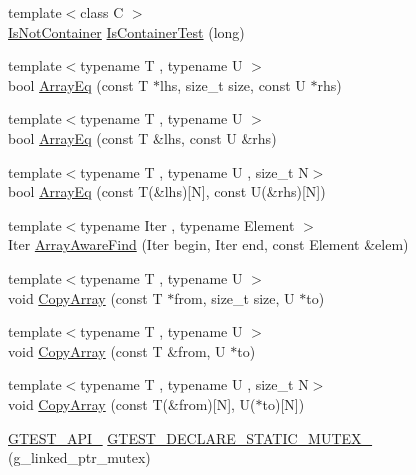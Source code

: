 \begin{DoxyCompactItemize}
\item 
{\footnotesize template$<$class C $>$ }\\\hyperlink{namespacetesting_1_1internal_abf080521ce135deb510e0a7830fd3d33}{Is\+Not\+Container} \hyperlink{namespacetesting_1_1internal_af545a2ae928b8a9e7581978234464275}{Is\+Container\+Test} (long)
\item 
{\footnotesize template$<$typename T , typename U $>$ }\\bool \hyperlink{namespacetesting_1_1internal_af4bebf36baf0b0a5b26d051dde55fa47}{Array\+Eq} (const T $\ast$lhs, size\+\_\+t size, const U $\ast$rhs)
\item 
{\footnotesize template$<$typename T , typename U $>$ }\\bool \hyperlink{namespacetesting_1_1internal_a49b4d0ee49c0f8c93bab29ebd20630cc}{Array\+Eq} (const T \&lhs, const U \&rhs)
\item 
{\footnotesize template$<$typename T , typename U , size\+\_\+t N$>$ }\\bool \hyperlink{namespacetesting_1_1internal_a5cb6f81ee827130024261121c742b26c}{Array\+Eq} (const T(\&lhs)\mbox{[}N\mbox{]}, const U(\&rhs)\mbox{[}N\mbox{]})
\item 
{\footnotesize template$<$typename Iter , typename Element $>$ }\\Iter \hyperlink{namespacetesting_1_1internal_a94a857fe6ff32cf4fdc4769a4071f239}{Array\+Aware\+Find} (Iter begin, Iter end, const Element \&elem)
\item 
{\footnotesize template$<$typename T , typename U $>$ }\\void \hyperlink{namespacetesting_1_1internal_afb1b9728aaaf6d9fe6246a19cfe3f7f5}{Copy\+Array} (const T $\ast$from, size\+\_\+t size, U $\ast$to)
\item 
{\footnotesize template$<$typename T , typename U $>$ }\\void \hyperlink{namespacetesting_1_1internal_a84d0e746ba0827cc52b53d22000de0e8}{Copy\+Array} (const T \&from, U $\ast$to)
\item 
{\footnotesize template$<$typename T , typename U , size\+\_\+t N$>$ }\\void \hyperlink{namespacetesting_1_1internal_a1e7ae855686720615dcd5754c8181c62}{Copy\+Array} (const T(\&from)\mbox{[}N\mbox{]}, U($\ast$to)\mbox{[}N\mbox{]})
\item 
\hyperlink{gtest-port_8h_aa73be6f0ba4a7456180a94904ce17790}{G\+T\+E\+S\+T\+\_\+\+A\+P\+I\+\_\+} \hyperlink{namespacetesting_1_1internal_ad7c5625384cf5f6b714188f274537ef6}{G\+T\+E\+S\+T\+\_\+\+D\+E\+C\+L\+A\+R\+E\+\_\+\+S\+T\+A\+T\+I\+C\+\_\+\+M\+U\+T\+E\+X\+\_\+} (g\+\_\+linked\+\_\+ptr\+\_\+mutex)

\end{DoxyCompactItemize}
